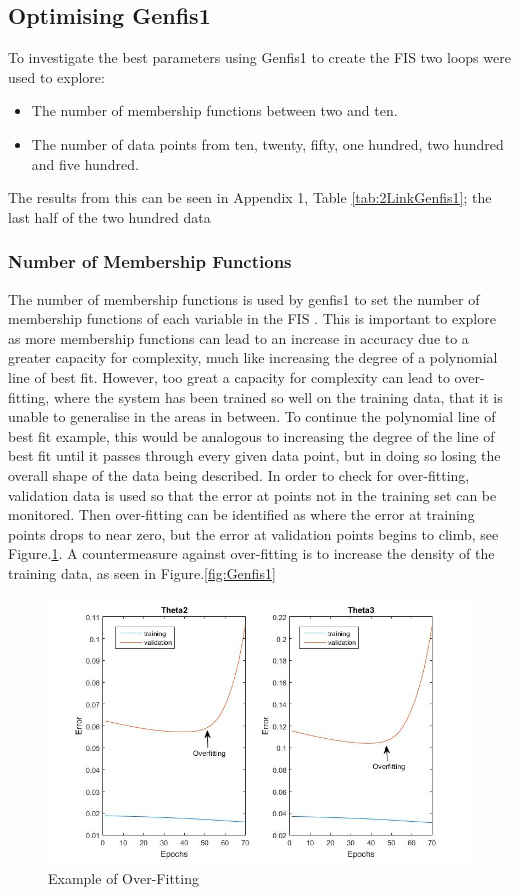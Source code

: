 \documentclass[11.5pt, twoside, a4paper]{article}
\begin{document}
\subsection{Optimising Genfis1}
To investigate the best parameters using Genfis1 to create the FIS two loops were used to explore:
\begin{itemize}
\item The number of membership functions between two and ten.
\item The number of data points from ten, twenty, fifty, one hundred, two hundred and five hundred.
\end{itemize}
The results from this can be seen in Appendix 1, Table \ref{tab:2LinkGenfis1}; the last half of the two hundred data

\subsubsection{Number of Membership Functions}
The number of membership functions is used by genfis1 to set the number of membership functions of each variable in the FIS \cite{genfis1}. This is important to explore as more membership functions can lead to an increase in accuracy due to a greater capacity for complexity, much like increasing the degree of a polynomial line of best fit. However, too great a capacity for complexity can lead to over-fitting, where the system has been trained so well on the training data, that it is unable to generalise in the areas in between. To continue the polynomial line of best fit example, this would be analogous to increasing the degree of the line of best fit until it passes through every given data point, but in doing so losing the overall shape of the data being described. In order to check for over-fitting, validation data is used so that the error at points not in the training set can be monitored. Then over-fitting can be identified as where the error at training points drops to near zero, but the error at validation points begins to climb, see Figure.\ref{fig:Overfitting}. A countermeasure against over-fitting is to increase the density of the training data, as seen in Figure.\ref{fig:Genfis1}
\begin{figure}
\includegraphics[width=\linewidth]{OverFitting.jpg}
\caption{Example of Over-Fitting\label{fig:Overfitting}}
\end{figure}
\end{document}
